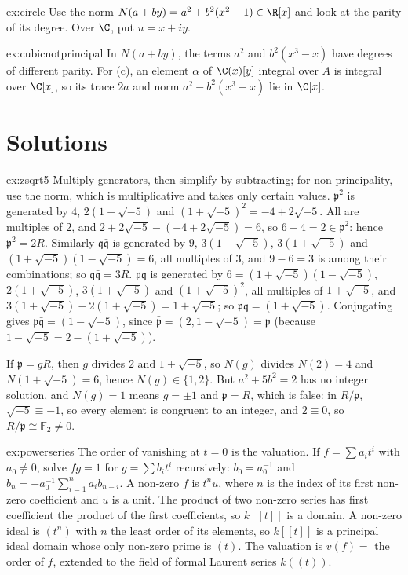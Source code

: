 \begin{hint}{ex:circle}
Use the norm $N(a+by)=a^2+b^2(x^2-1)\in\R[x]$ and look at the parity of its degree. Over $\C$, put $u=x+iy$.
\end{hint}

\begin{hint}{ex:cubicnotprincipal}
In $N(a+by)$, the terms $a^2$ and $b^2(x^3-x)$ have degrees of different parity. For (c), an element $\alpha$ of $\C(x)[y]$ integral over $A$ is integral over $\C[x]$, so its trace $2a$ and norm $a^2-b^2(x^3-x)$ lie in $\C[x]$.
\end{hint}

\section{Solutions}

\begin{solution}{ex:zsqrt5}
\idea Multiply generators, then simplify by subtracting; for non-principality, use the norm, which is multiplicative and takes only certain values.
\writeup $\mathfrak p^2$ is generated by $4$, $2(1+\sqrt{-5})$ and $(1+\sqrt{-5})^2=-4+2\sqrt{-5}$. All are multiples of $2$, and $2+2\sqrt{-5}-(-4+2\sqrt{-5})=6$, so $6-4=2\in\mathfrak p^2$: hence $\mathfrak p^2=2R$.
Similarly $\mathfrak q\bar{\mathfrak q}$ is generated by $9$, $3(1-\sqrt{-5})$, $3(1+\sqrt{-5})$ and $(1+\sqrt{-5})(1-\sqrt{-5})=6$, all multiples of $3$, and $9-6=3$ is among their combinations; so $\mathfrak q\bar{\mathfrak q}=3R$.
$\mathfrak p\mathfrak q$ is generated by $6=(1+\sqrt{-5})(1-\sqrt{-5})$, $2(1+\sqrt{-5})$, $3(1+\sqrt{-5})$ and $(1+\sqrt{-5})^2$, all multiples of $1+\sqrt{-5}$, and $3(1+\sqrt{-5})-2(1+\sqrt{-5})=1+\sqrt{-5}$; so $\mathfrak p\mathfrak q=(1+\sqrt{-5})$.
Conjugating gives $\mathfrak p\bar{\mathfrak q}=(1-\sqrt{-5})$, since $\bar{\mathfrak p}=(2,1-\sqrt{-5})=\mathfrak p$ (because $1-\sqrt{-5}=2-(1+\sqrt{-5})$).

If $\mathfrak p=gR$, then $g$ divides $2$ and $1+\sqrt{-5}$, so $N(g)$ divides $N(2)=4$ and $N(1+\sqrt{-5})=6$, hence $N(g)\in\{1,2\}$. But $a^2+5b^2=2$ has no integer solution, and $N(g)=1$ means $g=\pm1$ and $\mathfrak p=R$,
which is false: in $R/\mathfrak p$, $\sqrt{-5}\equiv-1$, so every element is congruent to an integer, and $2\equiv0$, so $R/\mathfrak p\cong\mathbb F_2\ne0$.
\end{solution}

\begin{solution}{ex:powerseries}
\idea The order of vanishing at $t=0$ is the valuation.
\writeup If $f=\sum a_it^i$ with $a_0\ne0$, solve $fg=1$ for $g=\sum b_it^i$ recursively: $b_0=a_0^{-1}$ and $b_n=-a_0^{-1}\sum_{i=1}^na_ib_{n-i}$. A non-zero $f$ is $t^nu$, where $n$ is the index of its first non-zero coefficient and
$u$ is a unit. The product of two non-zero series has first coefficient the product of the first coefficients, so $k[[t]]$ is a domain. A non-zero ideal is $(t^n)$ with $n$ the least order of its elements, so $k[[t]]$ is a principal ideal
domain whose only non-zero prime is $(t)$. The valuation is $v(f)=$ the order of $f$, extended to the field of formal Laurent series $k((t))$.
\end{solution}

